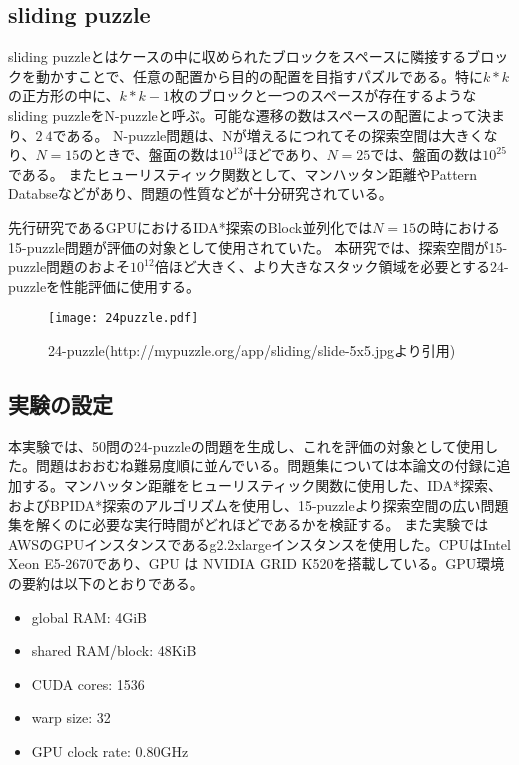 \documentclass[a4paper,11pt,oneside,openany]{jsbook}
\begin{document}
\subsection{sliding puzzle}
sliding puzzleとはケースの中に収められたブロックをスペースに隣接するブロックを動かすことで、任意の配置から目的の配置を目指すパズルである。特に$k * k$の正方形の中に、$ k * k - 1$枚のブロックと一つのスペースが存在するようなsliding puzzleをN-puzzleと呼ぶ。可能な遷移の数はスペースの配置によって決まり、$2~4$である。
N-puzzle問題は、Nが増えるにつれてその探索空間は大きくなり、$N=15$のときで、盤面の数は$10^13$ほどであり、$N=25$では、盤面の数は$10^25$である。
またヒューリスティック関数として、マンハッタン距離やPattern Databseなどがあり、問題の性質などが十分研究されている。

先行研究であるGPUにおけるIDA*探索のBlock並列化\cite{HA17}では$N=15$の時における15-puzzle問題が評価の対象として使用されていた。
本研究では、探索空間が15-puzzle問題のおよそ$10^12$倍ほど大きく、より大きなスタック領域を必要とする24-puzzleを性能評価に使用する。
\begin{figure}[htbp]
\begin{center}
\texttt{[image: 24puzzle.pdf]}
\caption{24-puzzle(http://mypuzzle.org/app/sliding/slide-5x5.jpgより引用)}
\end{center}
\end{figure}


\subsection{実験の設定}
本実験では、50問の24-puzzleの問題を生成し、これを評価の対象として使用した。問題はおおむね難易度順に並んでいる。問題集については本論文の付録に追加する。マンハッタン距離をヒューリスティック関数に使用した、IDA*探索、およびBPIDA*探索\cite{HA17}のアルゴリズムを使用し、15-puzzleより探索空間の広い問題集を解くのに必要な実行時間がどれほどであるかを検証する。
また実験ではAWSのGPUインスタンスであるg2.2xlargeインスタンスを使用した。CPUはIntel Xeon E5-2670であり、GPU
は NVIDIA GRID K520を搭載している。GPU環境の要約は以下のとおりである。
\begin{itemize}
 \item global RAM: 4GiB
 \item shared RAM/block: 48KiB
 \item CUDA cores: 1536
 \item warp size: 32
 \item GPU clock rate: 0.80GHz
\end{itemize}
\end{document}

